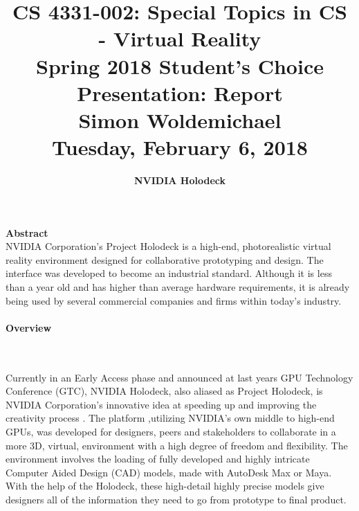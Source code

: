 \documentclass[11pt]{article}
\begin{document}
\title{\Large CS 4331-002: Special Topics in CS - Virtual Reality \\ Spring 2018 Student's Choice Presentation: Report \\ \Large Simon Woldemichael \\ Tuesday, February 6, 2018 \\}
\author{\LARGE \textbf{NVIDIA Holodeck}}
\vspace{-2cm}
\date{}

\maketitle
\vspace{-1cm}
\hspace{30pt}

\begin{center}
\textbf{Abstract}\\

NVIDIA Corporation's Project Holodeck is a high-end, photorealistic virtual reality environment designed for collaborative prototyping and design. The interface was developed to become an industrial standard. Although it is less than a year old and has higher than average hardware requirements, it is already being used by several commercial companies and firms within today's industry.
\end{center}

\paragraph{Overview} ~ \par 
Currently in an Early Access phase and announced at last years GPU Technology Conference (GTC), NVIDIA Holodeck, also aliased as Project Holodeck, is NVIDIA Corporation's innovative idea at speeding up and improving the creativity process \cite{nvidianews}. The platform ,utilizing NVIDIA's own middle to high-end GPUs, was developed for designers, peers and stakeholders to collaborate in a more 3D, virtual, environment \cite{nvidiamain} with a high degree of freedom and flexibility. The environment involves the loading of fully developed and highly intricate Computer Aided Design (CAD) models, made with AutoDesk Max or Maya. With the help of the Holodeck, these high-detail highly precise models give designers all of the information they need to go from prototype to final product.
\end{document}
